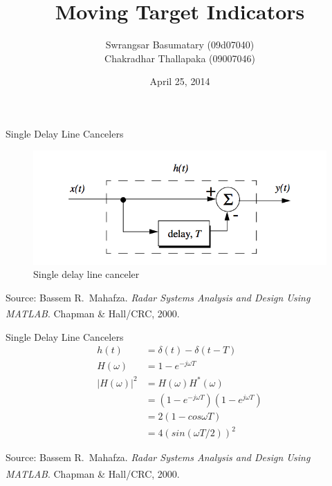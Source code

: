 \documentclass[mathserif]{beamer}
\title{Moving Target Indicators}
\author{Swrangsar Basumatary (09d07040) \\ Chakradhar Thallapaka (09007046)}
\institute{Department of Electrical Engineering \\ IIT Bombay, Powai}
\date{April 25, 2014}
\begin{document}
    \frame{\titlepage}
    
    \begin{frame}{Single Delay Line Cancelers}
    	\begin{figure}[h]
		\centering
		\includegraphics[width=\linewidth]{singleDLC} 
		\caption{Single delay line canceler}
	\end{figure}
		\tiny{Source: Bassem R.~Mahafza. \emph{Radar Systems Analysis and Design Using MATLAB\textsuperscript{\textregistered}}. Chapman \& Hall/CRC, 2000.}

    \end{frame}
    
    
    \begin{frame}{Single Delay Line Cancelers}
   	\begin{align}
    	 h(t) & = \delta(t) - \delta(t-T) \nonumber \\
    	 H(\omega) & = 1 - e^{-j\omega T} \nonumber \\
    	 |H(\omega)|^2 & = H(\omega)H^*(\omega) \nonumber \\
    	 & = (1 - e^{-j\omega T})(1 - e^{j\omega T}) \nonumber \\
    	 & = 2(1-cos\omega T) \nonumber \\
    	 & = 4(sin(\omega T/2))^2 \nonumber
    	\end{align}
    	
    	\vfill
    	\tiny{Source: Bassem R.~Mahafza. \emph{Radar Systems Analysis and Design Using MATLAB\textsuperscript{\textregistered}}. Chapman \& Hall/CRC, 2000.}

    \end{frame}
    
\end{document}
